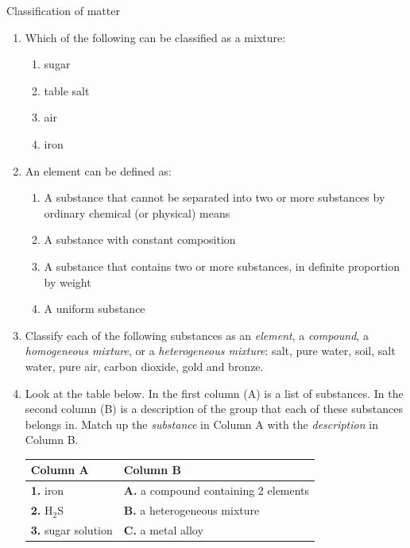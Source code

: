 \label{m38706*secfhsst!!!underscore!!!id672}
            \begin{eocexercises}{Classification of matter }{
            \nopagebreak
\begin{enumerate}[noitemsep, label=\textbf{\arabic*}. ] 
\item Which of the following can be classified as a mixture:
  \begin{enumerate}[noitemsep, label=\textbf{\alph*}. ] 
\item sugar
\item table salt
\item air
\item iron
\end{enumerate}
\item An element can be defined as:
\begin{enumerate}[noitemsep, label=\textbf{\alph*}.] 
\item A substance that cannot be separated into two or more substances by ordinary chemical (or physical) means
\item A substance with constant composition
\item A substance that contains two or more substances, in definite proportion by weight
\item A uniform substance
\end{enumerate}
\item Classify each of the following substances as an \textsl{element}, a \textsl{compound}, a \textsl{homogeneous mixture}, or a \textsl{heterogeneous mixture}: salt, pure water, soil, salt water, pure air, carbon dioxide, gold and bronze.\newline
\item Look at the table below. In the first column (A) is a list of substances. In the second column (B) is a description of the group that each of these substances belongs in. Match up the \textsl{substance} in Column A with the \textsl{description} in Column B.
          \begin{table}[H]
        \begin{center}
      \label{m38706*id68147}
      \begin{tabular}{|l|l|}\hline
\textbf{Column A} & \textbf{Column B} \\ \hline
\textbf{1. } iron & \textbf{A. } a compound containing 2 elements \\ \hline
\textbf{2. } H$_\text{2}$S & \textbf{B. } a heterogeneous mixture \\ \hline
\textbf{3. } sugar solution & \textbf{C. } a metal alloy \\ \hline

\end{tabular}
\end{center}
\end{table}
\end{enumerate}}
\end{eocexercises}
